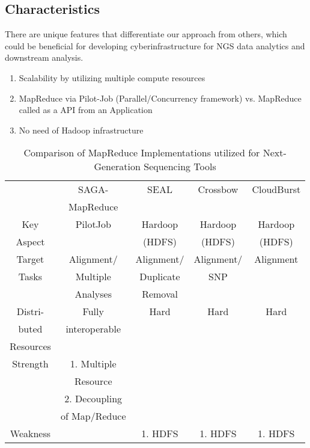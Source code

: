 \documentclass{sig-alternate}
\begin{document}
\subsection{Characteristics}

There are unique features that differentiate our approach from others, which could be beneficial for developing cyberinfrastructure for NGS data analytics and downstream analysis.  
\begin{enumerate}
\item Scalability by utilizing multiple compute resources
\item MapReduce via Pilot-Job (Parallel/Concurrency framework) vs. MapReduce called as a API from an Application   
\item No need of Hadoop infrastructure
\end{enumerate}
 
 




 \begin{table}
 \small
 \begin{tabular}{|c|c|c|c|c|} 
 \hline 
   &  SAGA- & SEAL & Crossbow & CloudBurst \\ 
   & MapReduce &  &  \\\hline
 Key  & PilotJob   &  Hardoop  &  Hardoop & Hardoop \\ 
 Aspect &   & (HDFS)  &  (HDFS) & (HDFS) \\ \hline
Target & Alignment/ & Alignment/ & Alignment/ & Alignment \\
 Tasks       & Multiple & Duplicate & SNP & \\ 
        & Analyses &  Removal & &  \\ \hline  
Distri-  & Fully   & Hard  & Hard & Hard \\
buted   & interoperable &  &   & \\ 
Resources &  &  &  & \\ \hline

Strength & 1. Multiple  &  &  &  \\ 
& Resource &  &  &  \\
&  2. Decoupling & &  &  \\ 
& of Map/Reduce &  &  &  \\ \hline
Weakness &  & 1. HDFS & 1. HDFS & 1. HDFS \\ \hline

\hline
\end{tabular}
\caption{Comparison of MapReduce Implementations utilized for Next-Generation Sequencing Tools}
  
  \label{table:mr-comparison} 
\end{table}
\end{document}

